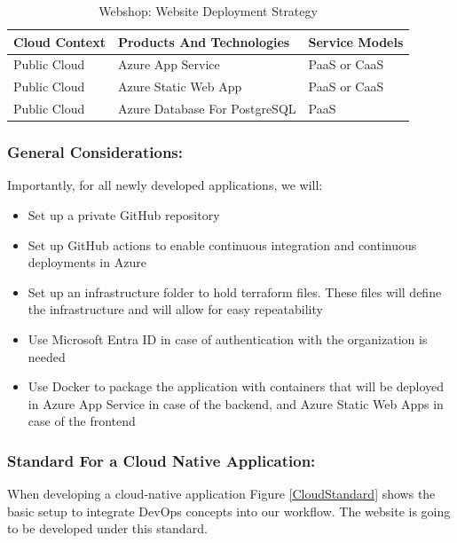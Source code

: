 \documentclass{llncs}
\begin{document}
\begin{table}[h!]
    \centering
    \begin{tabular}{lll}
        \hline
        \textbf{Cloud Context} & \textbf{Products And Technologies} & \textbf{Service Models} \\
        \hline
        Public Cloud           & Azure App Service                  & PaaS or CaaS            \\
        \hline
        Public Cloud           & Azure Static Web App               & PaaS or CaaS            \\
        \hline
        Public Cloud           & Azure Database For PostgreSQL      & PaaS                    \\
        \hline
    \end{tabular}
    \caption{Webshop: Website Deployment Strategy}
\end{table}

\subsubsection*{General Considerations:}

Importantly, for all newly developed applications, we will:
\begin{itemize}
    \item Set up a private GitHub repository
    \item Set up GitHub actions to enable continuous integration and continuous deployments in Azure
    \item Set up an infrastructure folder to hold terraform files. These files will define the infrastructure and will allow for easy repeatability
    \item Use Microsoft Entra ID in case of authentication with the organization is needed
    \item Use Docker to package the application with containers that will be deployed in Azure App Service in case of the backend, and Azure Static Web Apps in case of the frontend
\end{itemize}

\subsubsection*{Standard For a Cloud Native Application:}
When developing a cloud-native application Figure \ref{CloudStandard} shows the basic setup to integrate DevOps concepts into our workflow.
The website is going to be developed under this standard.\\
\end{document}
